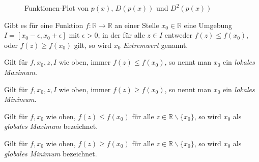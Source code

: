 \begin{figure}
\begin{center}
\caption[Polynom mit Ableitungen]{Funktionen-Plot von $p(x)$, $D(p(x))$ und $D^2(p(x))$}
\label{fig:polydiff}
\end{center}
\end{figure}

\begin{definition}
Gibt es für eine Funktion $f:\mathbb{R} \longrightarrow \mathbb{R}$ an einer Stelle $x_0 \in \mathbb{R}$ eine Umgebung $I = [x_0-\epsilon, x_0+\epsilon]$ mit $\epsilon>0 $, in der  für alle $z\in I$ entweder $f(z)\le f(x_0)$, oder $f(z)\ge f(x_0)$ gilt, so wird $x_0$ \textsl{Extremwert} genannt.
\end{definition}

\begin{definition}
Gilt für $f,x_0,z,I$ wie oben, immer $f(z)\le f(x_0)$, so nennt man $x_0$ ein \textsl{lokales Maximum}.
\end{definition}

\begin{definition}
Gilt für $f,x_0,z,I$ wie oben, immer $f(z)\ge f(x_0)$, so nennt man $x_0$ ein \textsl{lokales Minimum}.
\end{definition}

\begin{definition}
Gilt für $f,x_0$ wie oben, $f(z)\le f(x_0)$ für alle $z\in \mathbb{R}\backslash \{x_0\}$, so wird $x_0$ als \textsl{globales Maximum} bezeichnet.
\end{definition}

\begin{definition}
Gilt für $f,x_0$ wie oben, $f(z)\ge f(x_0)$ für alle $z\in \mathbb{R}\backslash \{x_0\}$, so wird $x_0$ als \textsl{globales Minimum} bezeichnet.
\end{definition}

